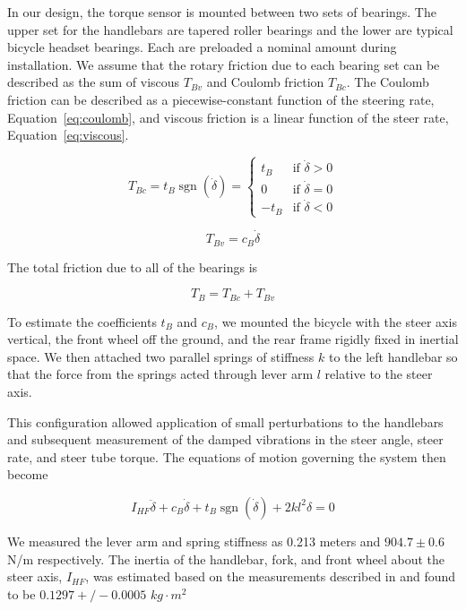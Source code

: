 \documentclass[10pt]{article}
\begin{document}
In our design, the torque sensor is mounted between two sets of bearings. The
upper set for the handlebars are tapered roller bearings and the lower are
typical bicycle headset bearings. Each are preloaded a nominal amount during
installation. We assume that the rotary friction due to each bearing set can be
described as the sum of viscous $T_{Bv}$ and Coulomb friction $T_{Bc}$. The
Coulomb friction can be described as a piecewise-constant function of the
steering rate, Equation~\ref{eq:coulomb}, and viscous friction is a linear
function of the steer rate, Equation~\ref{eq:viscous}.

\begin{equation}
  T_{Bc} = t_B \operatorname{sgn}(\dot\delta) =
  \begin{cases}
    t_B  & \textrm{if $\dot{\delta}>0$}\\
    0    & \textrm{if $\dot{\delta}=0$}\\
    -t_B & \textrm{if $\dot{\delta}<0$}
  \end{cases}
  \label{eq:coulomb}
\end{equation}

\begin{equation}
  \label{eq:viscous}
  T_{Bv} = c_B \dot{\delta}
\end{equation}

The total friction due to all of the bearings is

\begin{equation}
  T_B = T_{Bc} + T_{Bv}
\end{equation}

To estimate the coefficients $t_B$ and $c_B$, we mounted the bicycle with the
steer axis vertical, the front wheel off the ground, and the rear frame rigidly
fixed in inertial space. We then attached two parallel springs of stiffness $k$
to the left handlebar so that the force from the springs acted through lever
arm $l$ relative to the steer axis.

This configuration allowed application of small perturbations to the handlebars
and subsequent measurement of the damped vibrations in the steer angle, steer
rate, and steer tube torque. The equations of motion governing the system then
become

\begin{equation}
  I_{HF} \ddot{\delta} + c_B \dot{\delta} + t_B
  \operatorname{sgn}(\dot{\delta}) + 2 k l^2 \delta = 0
\end{equation}

We measured the lever arm and spring stiffness as 0.213 meters and $904.7 \pm
0.6$ N/m respectively. The inertia of the handlebar, fork, and front wheel
about the steer axis, $I_{HF}$, was estimated based on the measurements
described in \cite{Moore2012} and found to be $0.1297+/-0.0005$ $kg\cdot m^2$
\end{document}

